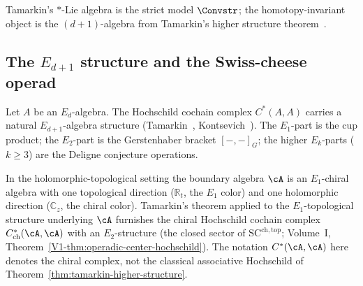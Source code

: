 \begin{remark}
\label{rem:tamarkin-two-level}
Tamarkin's $*$-Lie algebra is the strict model $\Convstr$;
the homotopy-invariant object is the $(d{+}1)$-algebra from
Tamarkin's higher structure theorem~\cite{Tamarkin00}.
\end{remark}

\subsection{\texorpdfstring{The $E_{d+1}$ structure and the Swiss-cheese operad}{The E(d+1) structure and the Swiss-cheese operad}}
\label{subsec:tamarkin-swiss-cheese}

\begin{theorem}
\label{thm:tamarkin-higher-structure}
Let $A$ be an $E_d$-algebra. The Hochschild cochain complex
$C^*(A,A)$ carries a natural $E_{d+1}$-algebra structure
\textup{(}Tamarkin~\textup{\cite{Tamarkin00}},
Kontsevich~\textup{\cite{Kon03})}. The $E_1$-part is the
cup product; the $E_2$-part is the Gerstenhaber bracket
$[-,-]_G$; the higher $E_k$-parts ($k\ge 3$) are the
Deligne conjecture operations.
\end{theorem}

In the holomorphic-topological setting the boundary algebra
$\cA$ is an $E_1$-chiral algebra with one topological direction
($\mathbb R_t$, the $E_1$ color) and one holomorphic direction
($\mathbb C_z$, the chiral color). Tamarkin's theorem applied
to the $E_1$-topological structure underlying $\cA$ furnishes
the chiral Hochschild cochain complex
$C^*_{\mathrm{ch}}(\cA,\cA)$ with an $E_2$-structure
(the closed sector of $\mathrm{SC}^{\mathrm{ch,top}}$;
Volume~I, Theorem~\ref*{V1-thm:operadic-center-hochschild}).
The notation $C^*(\cA,\cA)$ here denotes the chiral complex,
not the classical associative Hochschild of Theorem~\ref{thm:tamarkin-higher-structure}.

